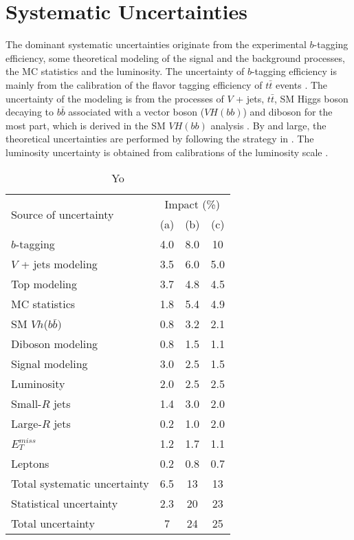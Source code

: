 \documentclass[class=NTHU_thesis, crop=false]{standalone}
\begin{document}
\chapter{Systematic Uncertainties}
\label{chap:systematic_uncertainties}
The dominant systematic uncertainties originate from the experimental $b$-tagging efficiency, some theoretical modeling of the signal and the background processes, the MC statistics and the luminosity. The uncertainty of $b$-tagging efficiency is mainly from the calibration of the flavor tagging efficiency of $t\bar{t}$ events \cite{ATL-PHYS-PUB-2017-013} \cite{1512.01094}. The uncertainty of the modeling is from the processes of $V$ + jets, $t\bar{t}$, SM Higgs boson decaying to $b\bar{b}$ associated with a vector boson ($VH(bb)$) and diboson for the most part, which is derived in the SM $VH(bb)$ analysis \cite{ATLAS-CONF-2018-036} \cite{Aaboud2017}. By and large, the theoretical uncertainties are performed by following the strategy in \cite{ATLAS-CONF-2018-036}. The luminosity uncertainty is obtained from calibrations of the luminosity scale \cite{Aaboud2016}.

\begin{table}[h]
	\centering
	\caption{Yo}
	\begin{tabular}{ l c c c }
		\hline
		\multirow{2}{*}{Source of uncertainty} & \multicolumn{3}{c}{Impact (\%)} \\ \cline{2-4}
		 & (a) & (b) & (c) \\ \hline
		$b$-tagging & 4.0 & 8.0 & 10 \\
		$V$ + jets modeling & 3.5 & 6.0 & 5.0 \\
		Top modeling & 3.7 & 4.8 & 4.5 \\
		MC statistics & 1.8 & 5.4 & 4.9 \\
		SM $Vh$($b\bar{b})$ & 0.8 & 3.2 & 2.1 \\
		Diboson modeling & 0.8 & 1.5 & 1.1 \\
		Signal modeling & 3.0 & 2.5 & 1.5 \\
		Luminosity & 2.0 & 2.5 & 2.5 \\
		Small-$R$ jets & 1.4 & 3.0 & 2.0 \\
		Large-$R$ jets & 0.2 & 1.0 & 2.0 \\
		$E^{miss}_T$ & 1.2 & 1.7 & 1.1 \\
		Leptons & 0.2 & 0.8 & 0.7 \\ \hline
		Total systematic uncertainty & 6.5 & 13 & 13 \\
		Statistical uncertainty & 2.3 & 20 & 23 \\
		Total uncertainty & 7 & 24 & 25 \\ \hline
	\end{tabular}
\end{table}
\end{document}
